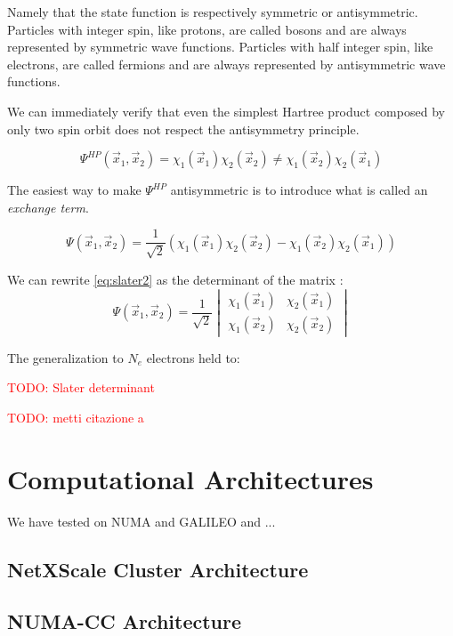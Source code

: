 \documentclass[a4paper,12pt]{article}
\newcommand\mynotes[1]{\begin{flushright}\textcolor{red}{TODO: #1}\end{flushright}}
\begin{document}
Namely that the state function is respectively symmetric or antisymmetric.
Particles with integer spin, like protons, are called bosons and are always represented by symmetric wave functions.
Particles with half integer spin, like electrons, are called fermions and are always represented by antisymmetric wave functions.

We can immediately verify that even the simplest Hartree product composed by only two spin orbit does not respect the antisymmetry principle.

\begin{equation*}
	\Psi^{HP}(\vec{x}_1,\vec{x}_2) = \chi_1(\vec{x}_1) \chi_2(\vec{x}_2) \neq \chi_1(\vec{x}_2) \chi_2(\vec{x}_1)
\end{equation*}

The easiest way to make $\Psi^{HP}$ antisymmetric is to introduce what is called an \textit{exchange term}.

\begin{equation}\label{eq:slater2}
	\Psi(\vec{x}_1,\vec{x}_2) = \frac{1}{\sqrt{2}} (\chi_1(\vec{x}_1) \chi_2(\vec{x}_2) - \chi_1(\vec{x}_2) \chi_2(\vec{x}_1))
\end{equation}

We can rewrite \eqref{eq:slater2} as the determinant of the matrix :
\begin{equation}
\Psi(\vec{x}_1,\vec{x}_2) = \frac{1}{\sqrt{2}}
\begin{vmatrix}
\chi_1(\vec{x}_1) & \chi_2(\vec{x}_1) \\
\chi_1(\vec{x}_2) & \chi_2(\vec{x}_2) 
\end{vmatrix}
\end{equation}

The generalization to $N_e$ electrons held to:
\mynotes{Slater determinant}

\mynotes{metti citazione a \cite{Dan}}



\section{Computational Architectures} \label{comparch:sec}


We have tested on NUMA and GALILEO and ...


\subsection{NetXScale Cluster Architecture}\label{galileoarch:sec}
\subsection{NUMA-CC Architecture}\label{numaarch:sec}
\end{document}

